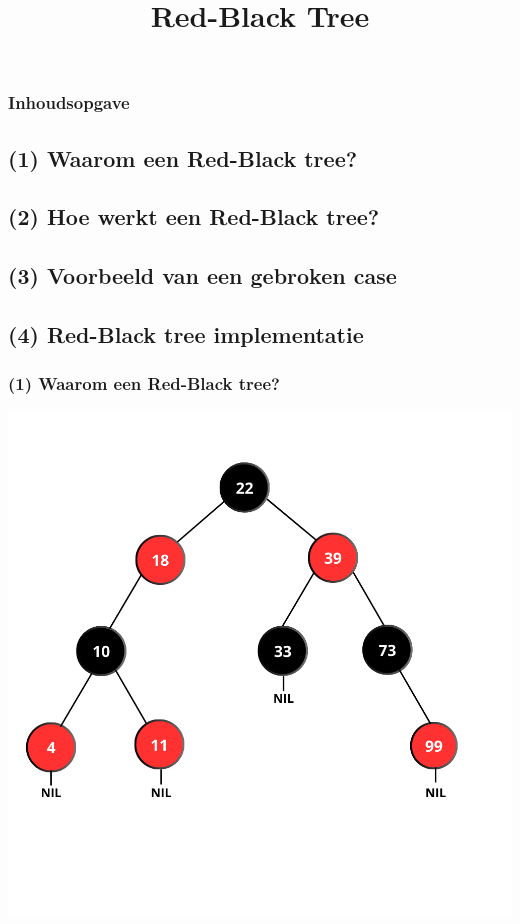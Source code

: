 \documentclass[aspectratio=169,sidebar,dyslexic]{uva-inf-presentation}
\title{Red-Black Tree}
\begin{document}
\begin{titelframe}
\titlepage
\end{titelframe}

\begin{titelframe}
\frametitle{Inhoudsopgave}
\tableofcontents
\end{titelframe}

\subsection{(1) Waarom een Red-Black tree?}
\subsection{(2) Hoe werkt een Red-Black tree?}
\subsection{(3) Voorbeeld van een gebroken case}
\subsection{(4) Red-Black tree implementatie}

\begin{frame}
\frametitle{(1) Waarom een Red-Black tree?}
\includegraphics[scale=.32]{RED-BLACK TREE.png}
\end{frame}
\end{document}
